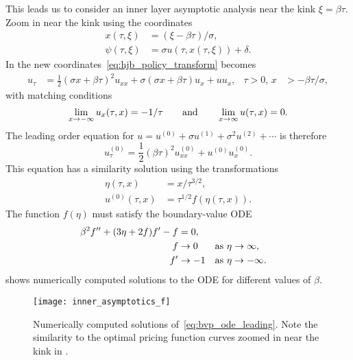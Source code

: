 \documentclass[main.tex]{subfiles}
\begin{document}
This leads us to consider an inner layer asymptotic analysis near
the kink $\xi = \beta \tau$. Zoom in near the kink using the
coordinates
\begin{align}
  x(\tau,\xi) &= (\xi-\beta \tau)/\sigma,\\
  \psi(\tau,\xi) &= \sigma
                   u(\tau,x(\tau,\xi)) + \delta.
\end{align}
In the new coordinates~\eqref{eq:hjb_policy_transform} becomes
\begin{align}
  u_\tau %
  &=\frac{1}{2}{(\sigma x + \beta \tau)}^2u_{xx}
    +\sigma (\sigma x+\beta \tau)u_x  %
    + uu_x,&\tau>0,\,x&> -\beta \tau/\sigma,
\end{align}
with matching conditions
\begin{equation}
  \lim_{x \to -\infty} u_x(\tau,x) = -1/\tau \qquad \textnormal{and}
  \qquad \lim_{x\to \infty}u(\tau,x) = 0.
\end{equation}
The leading order equation for $u = u^{(0)}+\sigma u^{(1)}+\sigma^2 u^{(2)}+\cdots$ is therefore
\begin{equation}
  u^{(0)}_\tau = \frac{1}{2}{(\beta \tau)}^2u^{(0)}_{xx} + u^{(0)}u^{(0)}_x.
\end{equation}
This equation has a similarity solution using the transformations
\begin{align}
  \eta(\tau,x)&= x/\tau^{3/2},\\
  u^{(0)}(\tau,x) &= \tau^{1/2}f(\eta(\tau,x)).
\end{align}
The function $f(\eta)$ must satisfy the boundary-value ODE
\begin{align}\label{eq:bvp_ode_leading}
  \beta^2f^{\prime\prime} + (3\eta + 2f)f^\prime - f
  &= 0,\\
  f&\to 0 &\textnormal{as } \eta&\to \infty,\\
  f^\prime &\to -1&\textnormal{as } \eta&\to -\infty.
\end{align}
 shows numerically computed solutions to the
ODE for different values of $\beta$.
\begin{figure}[hbt]
  \centering
  \texttt{[image: inner\_asymptotics\_f]}
  \caption[Numerically computed solutions of asymptotics problem]{Numerically computed solutions of~\eqref{eq:bvp_ode_leading}.
    Note the similarity to the optimal pricing function curves zoomed
    in near the kink in .
  }\label{fig:inner_leading_f}
\end{figure}
\end{document}
